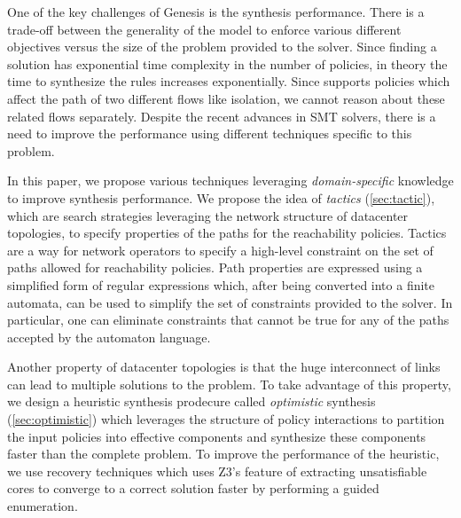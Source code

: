 One of the key challenges of Genesis is the synthesis
performance. There is a trade-off between the generality of the model
to enforce various different objectives versus the size of the problem
provided to the solver.  Since finding a solution has exponential time
complexity in the number of policies, in theory the time to
synthesize the rules increases exponentially. Since \Name supports policies
 which affect the path of two different flows like isolation, we cannot
 reason about these related flows separately.  
Despite the recent advances in SMT solvers, there is a need to improve the performance
using different techniques specific to this problem.


In this paper, we propose various techniques leveraging
\emph{domain-specific} knowledge to improve synthesis performance. We
propose the idea of \emph{tactics} (\cref{sec:tactic}), which are
search strategies leveraging the network structure of datacenter topologies, 
to specify properties of the paths for the reachability policies.  Tactics are 
a way for network operators to specify a high-level constraint on the set 
of paths allowed for reachability policies. 
Path properties are expressed using a simplified form of regular expressions which,
after being converted into a finite automata,
can be used
to simplify the set of constraints provided to the solver.
In particular, one can eliminate constraints that cannot be true for any of the paths
accepted by the automaton language. 


Another
property of datacenter topologies is that the huge interconnect of
links can lead to multiple solutions to the problem. 
To take advantage of this property, we design a
heuristic synthesis prodecure called \emph{optimistic} synthesis
(\cref{sec:optimistic}) which leverages the structure of policy
interactions to partition the input policies
into effective components and synthesize these components 
faster than the complete problem. To improve the performance of the heuristic, 
we use recovery techniques which uses Z3's feature of extracting 
unsatisfiable cores to converge to a correct solution faster by performing 
a guided enumeration.

